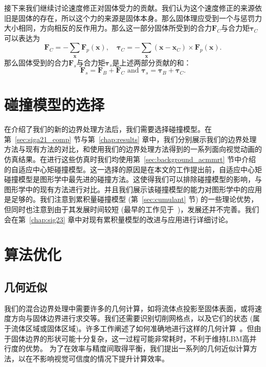 接下来我们继续讨论速度修正对固体受力的贡献。我们认为这个速度修正的来源依旧是固体的存在，所以这个力的来源是固体本身。那么固体理应受到一个与惩罚力大小相同，方向相反的反作用力。那么这一部分固体所受到的合力$\bm{F}_{C}$与合力矩$\bm{\tau}_{C}$可以表达为
\begin{equation}
\bm{F}_{C} = - \sum_{\bm{x}}\bm{F}_p(\bm{x}), \quad \bm{\tau}_{C} = - \sum_{\bm{x}} (\bm{x}-\bm{x}_{C})\times\bm{F}_p(\bm{x}).
\end{equation}
那么固体受到的合力$\bm{F}_s$与合力矩$\bm{\tau}_s$是上述两部分贡献的和：
\begin{equation}
\bm{F}_s = \bm{F}_{B} + \bm{F}_{C} \text{ and } \bm{\tau}_s = \bm{\tau}_{B} + \bm{\tau}_{C}.
\end{equation}

\section{碰撞模型的选择}
\label{sec:collision_selection}
在介绍了我们的新的边界处理方法后，我们需要选择碰撞模型。在第~\ref{sec:siga21_comp} 节与第~\ref{chap:results} 章中，我们分别展示我们的边界处理方法与现有方法的对比，和使用我们的边界处理方法得到的一系列面向视觉动画的仿真结果。在进行这些仿真时我们均使用第~\ref{sec:background_acmmrt} 节中介绍的自适应中心矩碰撞模型。这一选择的原因是在本文的工作提出前，自适应中心矩碰撞模型是图形学中最先进的碰撞方法。这使得我们可以排除碰撞模型的影响，与图形学中的现有方法进行对比。并且我们展示该碰撞模型的能力对图形学中的应用是足够的。我们注意到累积量碰撞模型 (第~\ref{sec:cumulant} 节) 的一些理论优势，但同时也注意到由于其发展时间较短 (最早的工作见于~\citep{Geier-2015})，发展还并不完善。我们会在第~\ref{chap:sig23} 章中对现有累积量模型的改进与应用进行详细讨论。

\section{算法优化}
\subsection{几何近似}
我们的混合边界处理中需要许多的几何计算，如将流体点投影至固体表面，或将速度方向与固体边界进行求交等。我们还需要识别切削网格点，以及它们的状态 (属于流体区域或固体区域)。许多工作阐述了如何准确地进行这样的几何计算~\citep{Azevedo-2016,Robinson:2009}。但由于固体边界的形状可能十分复杂，这一过程可能非常耗时，不利于维持LBM高并行度的优势。
为了在效率与精度间取得平衡，我们提出一系列的几何近似计算方法，以在不影响视觉可信度的情况下提升计算效率。

